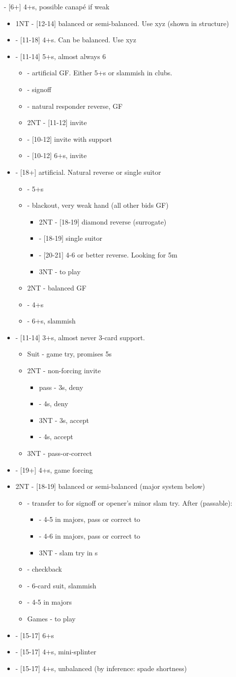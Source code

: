 \documentclass[12pt]{report}
\newcommand{\q}[1]{\multido{}{#1}{\qquad}}
\newcommand{\ul}[1]{\begin{itemize}#1\end{itemize}}
\newcommand{\li}[1]{\item[~] \q{#1}}
\begin{document}
\begin{center}
{        \li0  - [6+] 4+\he{}s, possible \di{} canapé if weak
        \ul {
            \li0 1NT - [12-14] balanced or semi-balanced.  Use xyz (shown in \di1 structure)
            \li0 \sp1 - [11-18] 4+\sp{}s.  Can be balanced.  Use xyz
            \li0 \cl2 - [11-14] 5+\cl{}s, almost always 6
            \ul {
                \li0 \di2 - artificial GF.  Either 5+\he{}s or slammish in clubs.
                \li0 \he2 - signoff
                \li0 \sp2 - natural responder reverse, GF
                \li0 2NT - [11-12] invite
                \li0 \cl3 - [10-12] invite with support
                \li0 \he3 - [10-12] 6+\he{}s, invite
            }
            \li0 \di2 - [18+] artificial.  Natural \di{} reverse or single suitor
            \ul {
                \li0 \he2 - 5+\he{}s
                \li0 \sp2 - blackout, very weak hand (all other bids GF)
                \ul {
                    \li0 2NT - [18-19] diamond reverse (surrogate)
                    \li0 \cl3 - [18-19] single suitor
                    \li0 \di3 - [20-21] 4-6 or better reverse.  Looking for 5m
                    \li0 3NT - to play
                }
                \li0 2NT - balanced GF
                \li0 \cl3 - 4+\cl{}s
                \li0 \he3 - 6+\he{}s, slammish
            }
            \li0 \he2 - [11-14] 3+\he{}s, almost never 3-card support.
            \ul {
                \li0 Suit - game try, promises 5\he{}s
                \li0 2NT - non-forcing invite
                \ul {
                    \li0 pass - 3\he{}s, deny
                    \li0 \he3 - 4\he{}s, deny
                    \li0 3NT - 3\he{}s, accept
                    \li0 \he4 - 4\he{}s, accept
                }
                \li0 3NT - pass-or-correct
            }
            \li0 \sp2 - [19+] 4+\sp{}s, game forcing
            \li0 2NT - [18-19] balanced or semi-balanced (major system below)
            \ul {
                \li0 \cl3 - transfer to \di{3} for signoff or opener's minor slam try.  After \di3 (passable):
                \ul {
                    \li0 \he3 - 4-5 in majors, pass or correct to \sp3
                    \li0 \sp3 - 4-6 in majors, pass or correct to \he4
                    \li0 3NT - slam try in \cl{}s
                }
                \li0 \di3 - checkback
                \li0 \he3 - 6-card suit, slammish
                \li0 \sp3 - 4-5 in majors
                \li0 Games - to play
            }
            \li0 \cl3 - [15-17] 6+\cl{}s
            \li0 \di3 - [15-17] 4+\he{}s, mini-splinter
            \li0 \he3 - [15-17] 4+\he{}s, unbalanced (by inference: spade shortness)
}}
\end{center}
\end{document}
